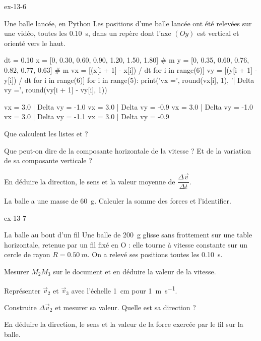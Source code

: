 \begin{blocLivre}{ex-13-6}
\begin{exercice}[2]{Une balle lancée, en Python}
Les positions d'une balle lancée ont été relevées sur une vidéo, toutes les \qty{0,10}{s}, dans un repère dont l'axe $(Oy)$ est vertical et
orienté vers le haut.
\begin{python}
dt = 0.10
x = [0, 0.30, 0.60, 0.90, 1.20, 1.50, 1.80]       # m
y = [0, 0.35, 0.60, 0.76, 0.82, 0.77, 0.63]       # m
vx = [(x[i + 1] - x[i]) / dt for i in range(6)]
vy = [(y[i + 1] - y[i]) / dt for i in range(6)]
for i in range(5):
    print('vx =', round(vx[i], 1), '| Delta vy =', round(vy[i + 1] - vy[i], 1))
\end{python}
\begin{console}
vx = 3.0 | Delta vy = -1.0
vx = 3.0 | Delta vy = -0.9
vx = 3.0 | Delta vy = -1.0
vx = 3.0 | Delta vy = -1.1
vx = 3.0 | Delta vy = -0.9
\end{console}
\begin{questions}
\item {}Que calculent les listes  et  ?
\item Que peut-on dire de la composante horizontale de la vitesse ? Et de la variation de sa composante verticale ?
\item En déduire la direction, le sens et la valeur moyenne de $\dfrac{\Delta\vec{v}}{\Delta t}$.
\item La balle a une masse de \qty{60}{g}. Calculer la somme des forces et l'identifier.
\end{questions}
\end{exercice}
\end{blocLivre}
\begin{blocLivre}{ex-13-7}
\begin{exercice}[2]{La balle au bout d'un fil}
Une balle de \qty{200}{g} glisse sans frottement sur une table horizontale, retenue par un fil fixé en O : elle tourne à vitesse constante
sur un cercle de rayon $R=\qty{0,50}{m}$. On a relevé ses positions toutes les \qty{0,10}{s}.
\begin{questions}
\item Mesurer $M_2M_3$ sur le document et en déduire la valeur de la vitesse.
\item Représenter $\vec{v}_2$ et $\vec{v}_3$ avec l'échelle \qty{1}{cm} pour \qty{1}{m.s^{-1}}.
\item Construire $\Delta\vec{v}_2$ et mesurer sa valeur. Quelle est sa direction ?
\item En déduire la direction, le sens et la valeur de la force exercée par le fil sur la balle.
\end{questions}
\end{exercice}
\end{blocLivre}
